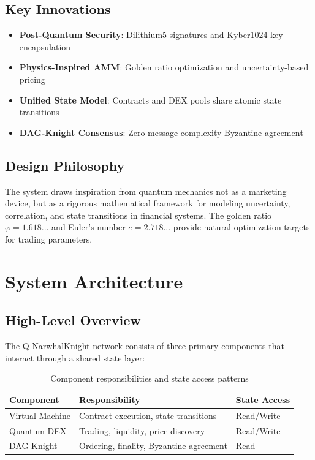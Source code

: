 \documentclass[11pt,a4paper]{article}
\begin{document}
\subsection{Key Innovations}

\begin{itemize}[leftmargin=*]
    \item \textbf{Post-Quantum Security}: Dilithium5 signatures and Kyber1024 key encapsulation
    \item \textbf{Physics-Inspired AMM}: Golden ratio optimization and uncertainty-based pricing
    \item \textbf{Unified State Model}: Contracts and DEX pools share atomic state transitions
    \item \textbf{DAG-Knight Consensus}: Zero-message-complexity Byzantine agreement
\end{itemize}

\subsection{Design Philosophy}

The system draws inspiration from quantum mechanics not as a marketing device, but as a rigorous mathematical framework for modeling uncertainty, correlation, and state transitions in financial systems. The golden ratio $\varphi = 1.618...$ and Euler's number $e = 2.718...$ provide natural optimization targets for trading parameters.

\section{System Architecture}

\subsection{High-Level Overview}

The Q-NarwhalKnight network consists of three primary components that interact through a shared state layer:

\begin{table}[H]
\centering
\begin{tabular}{lll}
\toprule
\textbf{Component} & \textbf{Responsibility} & \textbf{State Access} \\
\midrule
Virtual Machine & Contract execution, state transitions & Read/Write \\
Quantum DEX & Trading, liquidity, price discovery & Read/Write \\
DAG-Knight & Ordering, finality, Byzantine agreement & Read \\
\bottomrule
\end{tabular}
\caption{Component responsibilities and state access patterns}
\end{table}
\end{document}
